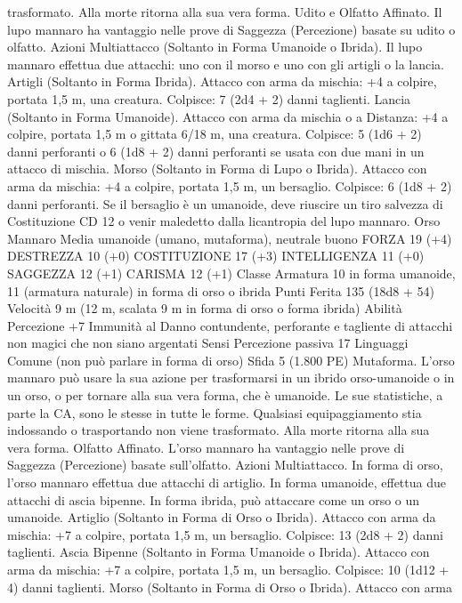 \begin{multicols}{2}
trasformato. Alla morte ritorna alla sua vera forma.
Udito e Olfatto Affinato. Il lupo mannaro ha vantaggio nelle
prove di Saggezza (Percezione) basate su udito o olfatto.
Azioni
Multiattacco (Soltanto in Forma Umanoide o Ibrida). Il lupo
mannaro effettua due attacchi: uno con il morso e uno con gli
artigli o la lancia.
Artigli (Soltanto in Forma Ibrida). Attacco con arma da
mischia: +4 a colpire, portata 1,5 m, una creatura.
Colpisce: 7 (2d4 + 2) danni taglienti.
Lancia (Soltanto in Forma Umanoide). Attacco con arma da
mischia o a Distanza: +4 a colpire, portata 1,5 m o gittata 6/18
m, una creatura.
Colpisce: 5 (1d6 + 2) danni perforanti o 6 (1d8 + 2) danni
perforanti se usata con due mani in un attacco di mischia.
Morso (Soltanto in Forma di Lupo o Ibrida). Attacco con arma
da mischia: +4 a colpire, portata 1,5 m, un bersaglio.
Colpisce: 6 (1d8 + 2) danni perforanti. Se il bersaglio è un
umanoide, deve riuscire un tiro salvezza di Costituzione CD 12 o
venir maledetto dalla licantropia del lupo mannaro.
Orso Mannaro
Media umanoide (umano, mutaforma), neutrale buono
FORZA 19 (+4)
DESTREZZA 10 (+0)
COSTITUZIONE 17 (+3)
INTELLIGENZA 11 (+0)
SAGGEZZA 12 (+1)
CARISMA 12 (+1)
Classe Armatura 10 in forma umanoide, 11 (armatura naturale)
in forma di orso o ibrida
Punti Ferita 135 (18d8 + 54)
Velocità 9 m (12 m, scalata 9 m in forma di orso o forma ibrida)
Abilità Percezione +7
Immunità al Danno contundente, perforante e tagliente di
attacchi non magici che non siano argentati
Sensi Percezione passiva 17
Linguaggi Comune (non può parlare in forma di orso)
Sfida 5 (1.800 PE)
Mutaforma. L’orso mannaro può usare la sua azione per
trasformarsi in un ibrido orso-umanoide o in un orso, o per
tornare alla sua vera forma, che è umanoide. Le sue statistiche, a
parte la CA, sono le stesse in tutte le forme. Qualsiasi
equipaggiamento stia indossando o trasportando non viene
trasformato. Alla morte ritorna alla sua vera forma.
Olfatto Affinato. L’orso mannaro ha vantaggio nelle prove di
Saggezza (Percezione) basate sull’olfatto.
Azioni
Multiattacco. In forma di orso, l’orso mannaro effettua due
attacchi di artiglio. In forma umanoide, effettua due attacchi di
ascia bipenne. In forma ibrida, può attaccare come un orso o un
umanoide.
Artiglio (Soltanto in Forma di Orso o Ibrida). Attacco con arma
da mischia: +7 a colpire, portata 1,5 m, un bersaglio.
Colpisce: 13 (2d8 + 2) danni taglienti.
Ascia Bipenne (Soltanto in Forma Umanoide o Ibrida). Attacco
con arma da mischia: +7 a colpire, portata 1,5 m, un bersaglio.
Colpisce: 10 (1d12 + 4) danni taglienti.
Morso (Soltanto in Forma di Orso o Ibrida). Attacco con arma

\end{multicols}
